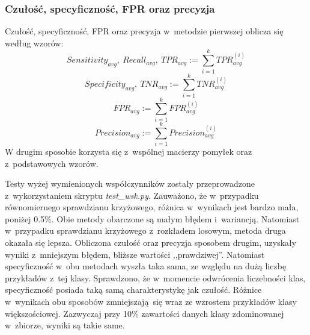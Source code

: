 \subsubsection{Czułość, specyficzność, FPR oraz precyzja}
Czułość, specyficzność, FPR oraz precyzja w~metodzie pierwszej oblicza się według wzorów:
\[Sensitivity_{avg},\ Recall_{avg},\ TPR_{avg} := \sum_{i=1}^{k} TPR_{avg}^{(i)}\]
\[Specificity_{avg},\ TNR_{avg} := \sum_{i=1}^{k} TNR_{avg}^{(i)}\]
\[FPR_{avg} := \sum_{i=1}^{k} FPR_{avg}^{(i)}\]
\[Precision_{avg} := \sum_{i=1}^{k} Precision_{avg}^{(i)}\]
W drugim sposobie korzysta się z~wspólnej macierzy pomyłek oraz z~podstawowych wzorów. \par
Testy wyżej wymienionych współczynników zostały przeprowadzone z~wykorzystaniem skryptu \textit{test\_wsk.py}. Zauważono, że w~przypadku równomiernego sprawdzianu krzyżowego, różnica w~wynikach jest bardzo mała, poniżej 0.5\%. Obie metody obarczone są małym błędem i~wariancją. Natomiast w~przypadku sprawdzianu krzyżowego z~rozkładem losowym, metoda druga okazała się lepsza. Obliczona czułość oraz precyzja sposobem drugim, uzyskały wyniki z~mniejszym błędem, bliższe wartości ,,prawdziwej''. Natomiast specyficzność w~obu metodach wyszła taka sama, ze względu na dużą liczbę przykładów z~tej klasy. Sprawdzono, że w~momencie odwrócenia liczebności klas, specyficzność posiada taką samą charakterystykę jak czułość. Różnice w~wynikach obu sposobów zmniejszają się wraz ze wzrostem przykładów klasy większościowej. Zazwyczaj przy 10\% zawartości danych klasy zdominowanej w~zbiorze, wyniki są takie same.
